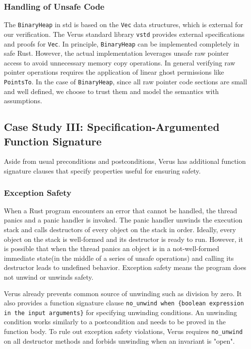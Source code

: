 \documentclass[conference]{IEEEtran}
\begin{document}
\subsubsection{Handling of Unsafe Code}
The \texttt{BinaryHeap} in std is based on the \texttt{Vec} data structures, which is external for our verification. The Verus standard library \texttt{vstd} provides external specifications and proofs for \texttt{Vec}. In principle, \texttt{BinaryHeap} can be implemented completely in safe Rust. However, the actual implementation leverages unsafe raw pointer access to avoid unnecessary memory copy operations. In general verifying raw pointer operations requires the application of linear ghost permissions like \texttt{PointsTo}. In the case of \texttt{BinaryHeap}, since all raw pointer code sections are small and well defined, we choose to trust them and model the semantics with assumptions. 

\subsection{Case Study III: Specification-Argumented Function Signature}
Aside from usual preconditions and postconditions, Verus has additional function signature clauses that specify properties useful for ensuring safety. 
\subsubsection{Exception Safety}
When a Rust program encounters an error that cannot be handled, the thread panics and a panic handler is invoked. The panic handler unwinds the execution stack and calls destructors of every object on the stack in order. Ideally, every object on the stack is well-formed and its destructor is ready to run. However, it is possible that when the thread panics an object is in a not-well-formed immediate state(in the middle of a series of unsafe operations) and calling its destructor leads to undefined behavior. Exception safety means the program does not unwind or unwinds safety.     

Verus already prevents common source of unwinding such as division by zero. It also provides a function signature clause \texttt{no\_unwind when \{boolean expression in the input arguments\}} for specifying unwinding conditions. An unwinding condition works similarly to a postcondition and needs to be proved in the function body. To rule out exception safety violations, Verus requires \texttt{no\_unwind} on all destructor methods and forbids unwinding when an invariant is "open".  
\end{document}
